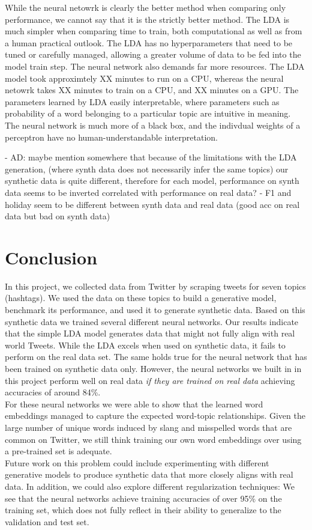 \documentclass[11pt]{article}
\begin{document}
While the neural netowrk is clearly the better method when comparing only performance, we cannot say that it is the strictly better method. The LDA is much simpler when comparing time to train, both computational as well as from a human practical outlook. The LDA has no hyperparameters that need to be tuned or carefully managed, allowing a greater volume of data to be fed into the model train step. The neural network also demands far more resources. The LDA model took approximtely XX minutes to run on a CPU, whereas the neural netowrk takes XX minutes to train on a CPU, and XX minutes on a GPU. The parameters learned by LDA easily interpretable, where parameters such as probability of a word belonging to a particular topic are intuitive in meaning. The neural network is much more of a black box, and the indivdual weights of a perceptron have no human-understandable interpretation. 

- AD: maybe mention somewhere that because of the limitations with the LDA generation, (where synth data does not necessarily infer the same topics) our synthetic data is quite different, therefore for each model, performance on synth data seems to be inverted correlated with performance on real data?
- F1 and holiday seem to be different between synth data and real data (good acc on real data but bad on synth data)


\section{Conclusion}
In this project, we collected data from Twitter by scraping tweets for seven topics (hashtags). We used the data on these topics to build a generative model, benchmark its performance, and used it to generate synthetic data. Based on this synthetic data we trained several different neural networks. 
Our results indicate that the simple LDA model generates data that might not fully align with real world Tweets. While the LDA excels when used on synthetic data, it fails to perform on the real data set. The same holds true for the neural network that has been trained on synthetic data only. However, the neural networks we built in in this project perform well on real data \emph{if they are trained on real data} achieving accuracies of around 84\%.
\\[5pt]
\noindent For these neural networks we were able to show that the learned word embeddings managed to capture the expected word-topic relationships. Given the large number of unique words induced by slang and misspelled words that are common on Twitter, we still think training our own word embeddings over using a pre-trained set is adequate.
\\[5pt]
\noindent Future work on this problem could include experimenting with different generative models to produce synthetic data that more closely aligns with real data. In addition, we could also explore different regularization techniques: We see that the neural networks achieve training accuracies of over 95\% on the training set, which does not fully reflect in their ability to generalize to the validation and test set. 

\newpage
\printbibliography
\end{document}
